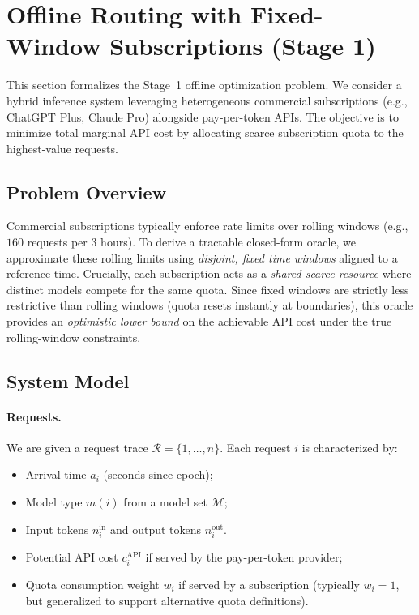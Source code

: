 \documentclass[11pt]{article}
\begin{document}
\section{Offline Routing with Fixed-Window Subscriptions (Stage 1)}
\label{sec:offline-stage1}

This section formalizes the Stage~1 offline optimization problem.
We consider a hybrid inference system leveraging heterogeneous commercial subscriptions (e.g., ChatGPT Plus, Claude Pro) alongside pay-per-token APIs.
The objective is to minimize total marginal API cost by allocating scarce subscription quota to the highest-value requests.

\subsection{Problem Overview}
Commercial subscriptions typically enforce rate limits over rolling windows (e.g., \(160\) requests per \(3\) hours).
To derive a tractable closed-form oracle, we approximate these rolling limits using \emph{disjoint, fixed time windows} aligned to a reference time.
Crucially, each subscription acts as a \emph{shared scarce resource} where distinct models compete for the same quota.
Since fixed windows are strictly less restrictive than rolling windows (quota resets instantly at boundaries), this oracle provides an \emph{optimistic lower bound} on the achievable API cost under the true rolling-window constraints.

\subsection{System Model}
\paragraph{Requests.}
We are given a request trace \(\mathcal{R} = \{1,\dots,n\}\). Each request \(i\) is characterized by:
\begin{itemize}
  \item Arrival time \(a_i\) (seconds since epoch);
  \item Model type \(m(i)\) from a model set \(\mathcal{M}\);
  \item Input tokens \(n_i^{\text{in}}\) and output tokens \(n_i^{\text{out}}\).
  \item Potential API cost \(c_i^{\text{API}}\) if served by the pay-per-token provider;
  \item Quota consumption weight \(w_i\) if served by a subscription (typically \(w_i=1\), but generalized to support alternative quota definitions).
\end{itemize}
\end{document}
